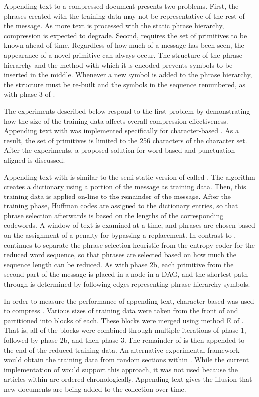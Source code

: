 Appending text to a compressed document
presents two problems.  First, the phrases created with the 
training data may not be representative of the rest of the
message.  As more text is processed with the static phrase hierarchy,
compression is expected to degrade.  Second, \remerge requires the
set of primitives to be known ahead of time.  Regardless of how much of
a message has been seen, the appearance
of a novel primitive can
always occur.  The structure of the phrase hierarchy and the method
with which it is encoded prevents symbols to be inserted in the middle.
Whenever a new symbol is added to the phrase hierarchy, the structure
must be re-built and the symbols in the sequence renumbered, as with
phase 3 of \remerge.  

The experiments described below respond to the first problem by demonstrating how
the size of the training data affects overall compression 
effectiveness.  Appending text with \remerge was implemented specifically
for character-based \repair.  As a result, the set of primitives is 
limited to the 256 characters of the \eascii
character set.  After the experiments, a proposed solution for 
word-based and punctuation-aligned \repair is discussed.

Appending text with \remerge is similar to the semi-static version of
\ray called \xray \citep{cw02:tis}.  The \xray algorithm creates a
dictionary using a portion of the message as training data.  Then,
this training data is applied on-line to the remainder of the
message.  After the training phase, Huffman codes are assigned to
the dictionary entries, so that phrase selection afterwards is based
on the lengths of the corresponding codewords.  A window of text
is examined at a time, and phrases are chosen based on the assignment
of a penalty for bypassing a replacement.  In contrast to \xray, 
\remerge continues to separate the phrase selection heuristic from
the entropy coder for the reduced word sequence, so that phrases are
selected based on how much the sequence length can be reduced.
As with phase 2b, each primitive from the second part of the message
is placed in a node in a DAG, and the shortest path through
is determined by following edges representing phrase hierarchy symbols.

In order to measure the performance of appending text,
character-based \repair was used to compress \wsjb.  Various sizes of
training data were taken from the front of \wsjb and partitioned into
blocks of  each.  These blocks were merged using method E of
\remerge.  That is, all of the blocks were combined through multiple 
iterations of phase 1, followed by phase 2b, and then phase 3.  
The remainder of \wsjb is then appended to the end of the reduced 
training data.  An alternative experimental framework would obtain
the training data from random sections within \wsjb.  While
the current implementation of \remerge would support this approach,
it was not used because the articles within \wsjb are ordered 
chronologically.  Appending text gives the illusion that new documents
are being added to the collection over time.

